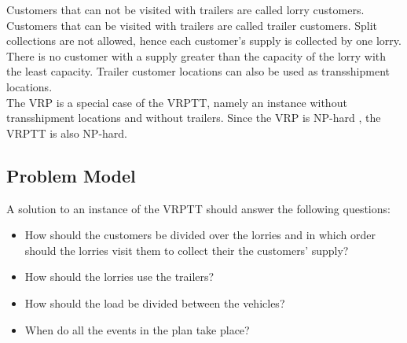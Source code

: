 Customers that can not be visited with trailers are called lorry customers. Customers that can be visited with trailers are called trailer customers. Split collections are not allowed, hence each customer's supply is collected by one lorry.
There is no customer with a supply greater than the capacity of the lorry with the least capacity.
Trailer customer locations can also be used as transshipment locations. \\



The VRP is a special case of the VRPTT, namely an instance without transshipment locations and without trailers. Since the VRP is NP-hard \cite{laporte2009fifty}, the VRPTT is also NP-hard.



\subsection{Problem Model}


A solution to an instance of the VRPTT should answer the following questions:

\begin{itemize}
\item How should the customers be divided over the lorries and in which order should the lorries visit them to collect their the customers' supply?
\item How should the lorries use the trailers?
\item How should the load be divided between the vehicles?
\item When do all the events in the plan take place?
\end{itemize}


